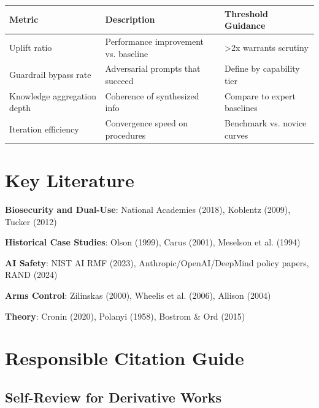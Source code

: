\documentclass[11pt,letterpaper]{article}
\begin{document}
\begin{center}
\small
\begin{tabular}{L{3.5cm}L{5cm}L{3.5cm}}
\toprule
\textbf{Metric} & \textbf{Description} & \textbf{Threshold Guidance} \\
\midrule
Uplift ratio & Performance improvement vs. baseline & >2x warrants scrutiny \\
Guardrail bypass rate & Adversarial prompts that succeed & Define by capability tier \\
Knowledge aggregation depth & Coherence of synthesized info & Compare to expert baselines \\
Iteration efficiency & Convergence speed on procedures & Benchmark vs. novice curves \\
\bottomrule
\end{tabular}
\end{center}

\section{Key Literature}

\textbf{Biosecurity and Dual-Use}: National Academies (2018), Koblentz (2009), Tucker (2012)

\textbf{Historical Case Studies}: Olson (1999), Carus (2001), Meselson et al. (1994)

\textbf{AI Safety}: NIST AI RMF (2023), Anthropic/OpenAI/DeepMind policy papers, RAND (2024)

\textbf{Arms Control}: Zilinskas (2000), Wheelis et al. (2006), Allison (2004)

\textbf{Theory}: Cronin (2020), Polanyi (1958), Bostrom \& Ord (2015)

\section{Responsible Citation Guide}

\subsection*{Self-Review for Derivative Works}
\end{document}
